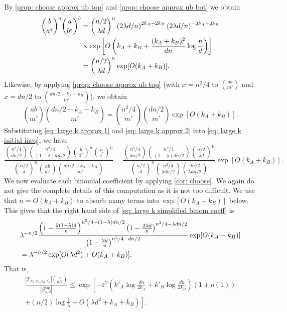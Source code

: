 \documentclass[11pt]{article}
\theoremstyle{plain}
\begin{document}
By \cref{prop: choose approx ub top} and  \cref{prop: choose approx ub bot}  we obtain 
\begin{align}
    \binom{b}{a^*}^a\binom{a}{b^*}^b &= \binom{n/2}{\lambda  d}^n\left(2\lambda  d/n\right)^{2k_A - 2k_B}(2 \lambda  d/n)^{-2k_A + 2k_B}\notag\\
    &\times\exp\left[O\left(k_A + k_B + \frac{(k_A + k_B)^2}{dn}\log\frac{n}{d}\right)\right]\notag\\
    &= \binom{n/2}{\lambda  d}^n\exp[O(k_A + k_B)].\label{eq: large k approx 1}
\end{align}
Likewise, by applying \cref{prop: choose approx ub top} (with $x = n^2/4$ to $\binom{ab}{m'}$ and $x = dn/2$ to \newline $\binom{dn/2 - k_A - k_B}{m'}$), we obtain
\begin{equation}\label{eq: large k approx 2}
    \binom{ab}{m'}\binom{dn/2 - k_A - k_B}{m'} = \binom{n^2/4}{m'}\binom{dn/2}{m'}\exp[O(k_A + k_B)].
\end{equation}
Substituting \eqref{eq: large k approx 1} and \eqref{eq: large k approx 2} into \eqref{eq: large k initial ineq}, we have 
\begin{equation}\label{eq: large k simplified binom coeff}
    \frac{\binom{n^2/4}{dn/2}\binom{n^2/4}{(1 - \lambda )dn/2}\binom{b}{a^*}^a\binom{a}{b^*}^b}{\binom{n/2}{d}^n\binom{ab}{m'}\binom{dn/2 - k_A - k_B}{m'}} = \frac{\binom{n^2/4}{dn/2}\binom{n^2/4}{(1 - \lambda )dn/2}\binom{n/2}{\lambda  d}^n}{\binom{n/2}{d}^n\binom{n^2/4}{\lambda  dn/2}\binom{dn/2}{\lambda  dn/2}}\exp[O(k_A + k_B)]. 
\end{equation}
We now evaluate each binomial coefficient by applying \cref{cor: choose}. We again do not give the complete details of this computation as it is not too difficult. We use that $n = O(k_A + k_B)$ to absorb many terms into $\exp[O(k_A + k_B)]$ below. This gives that the right hand side of \eqref{eq: large k simplified binom coeff} is 
\begin{align}
   & \lambda ^{-n/2}\frac{\left(1 - \frac{2(1-\lambda )d}{n}\right)^{n^2/4 - (1 - \lambda )dn/2}\left(1 - \frac{2\lambda d}{n}\right)^{n^2/4 - \lambda dn/2}}{\left(1 - \frac{2d}{n}\right)^{n^2/4 - dn/2 }}\exp[O(k_A + k_B)] \notag \\
   &= \lambda ^{-n/2}\exp[O(\lambda  d^2) + O(k_A + k_B)].\notag
\end{align}
That is, 
\begin{align*}
    \frac{|\mathcal T_{k_A, r_A, k_B, r_B}|\binom{n}{n/2}}{|\mathcal G_{n,d}^{\text{bip}}|} \leq \exp\left[-\varepsilon^2\left(k'_A\log\frac{dn}{2k_A} + k'_B\log\frac{dn}{2k_B}\right)(1 + o(1))\right.\\ \left.+ (n/2)\log\frac{1}{\lambda } + O(\lambda  d^2 + k_A + k_B)\right].
\end{align*}
\end{document}
